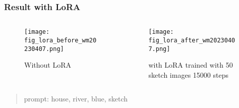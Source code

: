 \begin{frame}
    \frametitle{Result with LoRA}
    \begin{columns}[c] 
        \begin{column}{0.48\textwidth} %
            \begin{figure}
                \texttt{[image: fig\_lora\_before\_wm20230407.png]}
                \caption{Without LoRA}
            \end{figure}
        \end{column}
        \begin{column}{0.48\textwidth} %
            \begin{figure}
                \texttt{[image: fig\_lora\_after\_wm20230407.png]}
                \caption{with LoRA trained with 50 sketch images 15000 steps}
            \end{figure}
        \end{column}
    \end{columns}
    \begin{quote}prompt: house, river, blue, sketch
    \end{quote}
\end{frame}